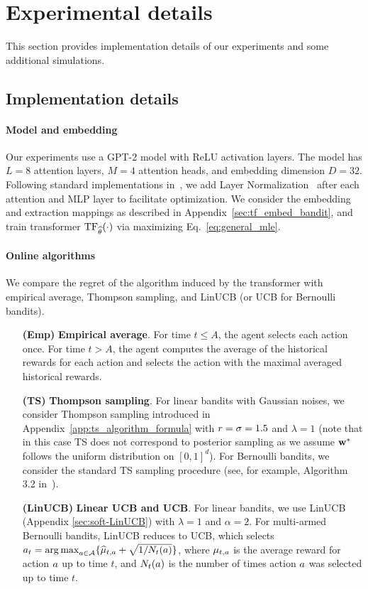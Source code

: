 \section{Experimental details}\label{sec:exp_details}


This section provides implementation details of our experiments and some additional simulations.

\subsection{Implementation details}
\paragraph{Model and embedding}

Our experiments use a GPT-2 model \citep{radford2019language} with ReLU activation layers. The model has $L=8$ attention layers, $M=4$ attention heads, and embedding dimension $D=32$. Following standard implementations in~\cite{vaswani2017attention}, we add Layer Normalization~\citep{ba2016layer} after each attention and MLP layer to facilitate optimization. We consider the embedding and extraction mappings as described in Appendix~\ref{sec:tf_embed_bandit}, and train transformer ${\rm TF}_{{\widehat{\theta}}}(\cdot)$ via  maximizing Eq.~\eqref{eq:general_mle}.
\paragraph{Online algorithms}
We compare the regret of the algorithm induced by the transformer with empirical average, Thompson sampling, and LinUCB (or UCB for Bernoulli bandits).
\begin{itemize}
\item[\textbf{(Emp)}]\textbf{Empirical average}. 
For time $t\leq A$, the agent selects each action once. For time $t>A$, the agent computes the average of the historical rewards for each action and selects the action with the maximal
averaged historical rewards.
\item[\textbf{(TS)}]\textbf{Thompson sampling}. For linear bandits with Gaussian noises, we consider Thompson sampling introduced in Appendix~\ref{app:ts_algorithm_formula} with ${r}=\sigma=1.5$ and $\lambda=1$ (note that in this case TS does not correspond to posterior sampling as we assume ${\mathbf w}^*$ follows the uniform distribution on $[0,1]^d$). For Bernoulli bandits,  we consider the standard TS sampling procedure (see, for example, Algorithm 3.2 in~\cite{russo2018tutorial}). 
\item[\textbf{(LinUCB)}]\textbf{Linear UCB and UCB}. For linear bandits, we use LinUCB (Appendix \ref{sec:soft-LinUCB}) with $\lambda=1$ and $\alpha=2$. For multi-armed Bernoulli bandits, LinUCB reduces to UCB, which selects ${a}_t=\operatorname*{arg\,max}_{{a}\in{\mathcal{A}}}\{\widehat \mu_{t,{a}}+\sqrt{1/{N}_t({a})}\}$, where $\mu_{t,{a}}$ is the average reward for action ${a}$ up to time $t$, and ${N}_t({a})$ is the number of times action ${a}$ was selected up to time $t$.
\end{itemize} 
